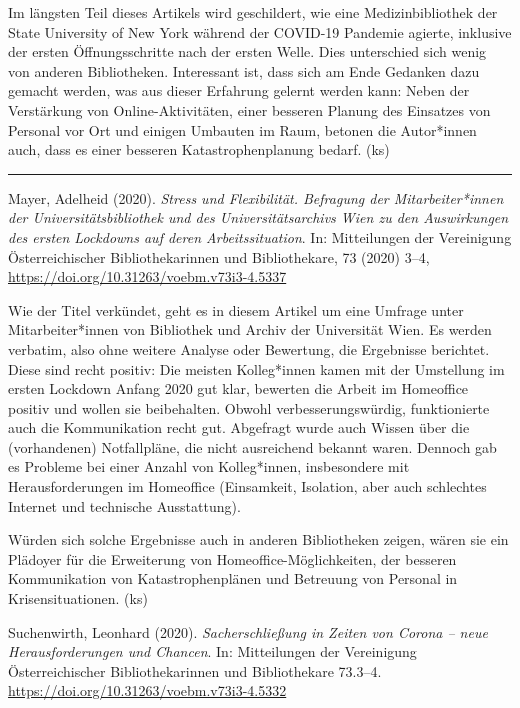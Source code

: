 \documentclass[a4paper,
fontsize=11pt,
oneside,
numbers=noperiodatend,
parskip=half-,
bibliography=totoc,
final
]{scrartcl}
\begin{document}
Im längsten Teil dieses Artikels wird geschildert, wie eine
Medizinbibliothek der State University of New York während der COVID-19
Pandemie agierte, inklusive der ersten Öffnungsschritte nach der ersten
Welle. Dies unterschied sich wenig von anderen Bibliotheken. Interessant
ist, dass sich am Ende Gedanken dazu gemacht werden, was aus dieser
Erfahrung gelernt werden kann: Neben der Verstärkung von
Online-Aktivitäten, einer besseren Planung des Einsatzes von Personal
vor Ort und einigen Umbauten im Raum, betonen die Autor*innen auch, dass
es einer besseren Katastrophenplanung bedarf. (ks)

\begin{center}\rule{0.5\linewidth}{0.5pt}\end{center}

Mayer, Adelheid (2020). \emph{Stress und Flexibilität. Befragung der
Mitarbeiter*innen der Universitätsbibliothek und des Universitätsarchivs
Wien zu den Auswirkungen des ersten Lockdowns auf deren
Arbeitssituation}. In: Mitteilungen der Vereinigung Österreichischer
Bibliothekarinnen und Bibliothekare, 73 (2020) 3--4,
\url{https://doi.org/10.31263/voebm.v73i3-4.5337}

Wie der Titel verkündet, geht es in diesem Artikel um eine Umfrage unter
Mitarbeiter*innen von Bibliothek und Archiv der Universität Wien. Es
werden verbatim, also ohne weitere Analyse oder Bewertung, die
Ergebnisse berichtet. Diese sind recht positiv: Die meisten Kolleg*innen
kamen mit der Umstellung im ersten Lockdown Anfang 2020 gut klar,
bewerten die Arbeit im Homeoffice positiv und wollen sie beibehalten.
Obwohl verbesserungswürdig, funktionierte auch die Kommunikation recht
gut. Abgefragt wurde auch Wissen über die (vorhandenen) Notfallpläne,
die nicht ausreichend bekannt waren. Dennoch gab es Probleme bei einer
Anzahl von Kolleg*innen, insbesondere mit Herausforderungen im
Homeoffice (Einsamkeit, Isolation, aber auch schlechtes Internet und
technische Ausstattung).

Würden sich solche Ergebnisse auch in anderen Bibliotheken zeigen, wären
sie ein Plädoyer für die Erweiterung von Homeoffice-Möglichkeiten, der
besseren Kommunikation von Katastrophenplänen und Betreuung von Personal
in Krisensituationen. (ks)


Suchenwirth, Leonhard (2020). \emph{Sacherschließung in Zeiten von
Corona -- neue Herausforderungen und Chancen}. In: Mitteilungen der
Vereinigung Österreichischer Bibliothekarinnen und Bibliothekare
73.3--4. \url{https://doi.org/10.31263/voebm.v73i3-4.5332}
\end{document}
